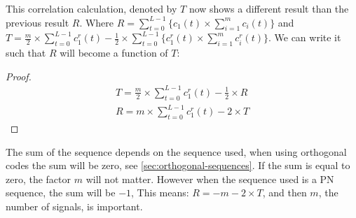 This correlation calculation, denoted by $T$ now shows a different result than the previous result $R$.
Where $R = \displaystyle\sum_{t = 0} ^ {L - 1}  \Bigg\{  c_1(t)	\times \displaystyle\sum_{i = 1} ^ {m} c_i(t) \Bigg\}$ and $T = \frac{m}{2} \times \displaystyle\sum_{t = 0} ^ {L - 1} c^r_1(t) - \frac{1}{2} \times \displaystyle\sum_{t = 0} ^ {L - 1}  \Bigg\{ c^r_1(t) \times \displaystyle\sum_{i = 1} ^ {m} c^r_i(t) \Bigg\}$.
We can write it such that $R$ will become a function of $T$: 

\begin{proof}

	\begin{align*}
	T = \frac{m}{2} \times \displaystyle\sum_{t = 0} ^ {L - 1} c^r_1(t) - \frac{1}{2} \times R
	\\ R = m \times \displaystyle\sum_{t = 0} ^ {L - 1} c^r_1(t) - 2 \times T
	\end{align*}

\end{proof}

The sum of the sequence depends on the sequence used, when using orthogonal codes the sum will be zero, see \autoref{sec:orthogonal-sequences}.
If the sum is equal to zero, the factor $m$ will not matter.
However when the sequence used is a PN sequence, the sum will be $-1$, This means: $R = -m - 2 \times T$, and then $m$, the number of signals, is important.









